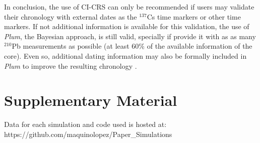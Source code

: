 \documentclass [10pt] {article}
\begin{document}
In conclusion, the use of CI-CRS can only be recommended if users may validate their chronology with external dates as the $^{137}$Cs time markers or other time markers. If not additional information is available for this validation, the use of \textit{Plum}, the Bayesian approach, is still valid, specially if provide it with as as many $^{210}$Pb measurements as possible (at least 60\% of the available information of the core).  Even so, additional dating information may also be formally included in \textit{Plum} to improve the resulting chronology \citep{Aquino2018,Aquino2020}. 




\newpage




\section{Supplementary Material}
\label{sec:supp_mat}
Data for each simulation and code used is hosted at: https://github.com/maquinolopez/Paper\_Simulations
\newpage
\end{document}
